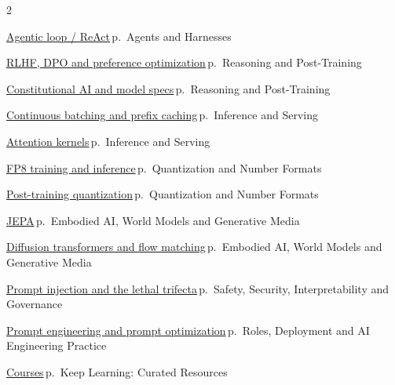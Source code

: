 \documentclass[10pt,a4paper,openany]{report}
\begin{document}
\begin{multicols}{2}\small\raggedright
\hyperref[c:agents-3]{Agentic loop / ReAct}\,{\color{muted}\scriptsize p.\,\pageref{c:agents-3}} {\color{muted}\scriptsize Agents and Harnesses}\par\vspace{2pt}
\hyperref[c:reasoning-6]{RLHF, DPO and preference optimization}\,{\color{muted}\scriptsize p.\,\pageref{c:reasoning-6}} {\color{muted}\scriptsize Reasoning and Post-Training}\par\vspace{2pt}
\hyperref[c:reasoning-7]{Constitutional AI and model specs}\,{\color{muted}\scriptsize p.\,\pageref{c:reasoning-7}} {\color{muted}\scriptsize Reasoning and Post-Training}\par\vspace{2pt}
\hyperref[c:inference-2]{Continuous batching and prefix caching}\,{\color{muted}\scriptsize p.\,\pageref{c:inference-2}} {\color{muted}\scriptsize Inference and Serving}\par\vspace{2pt}
\hyperref[c:inference-5]{Attention kernels}\,{\color{muted}\scriptsize p.\,\pageref{c:inference-5}} {\color{muted}\scriptsize Inference and Serving}\par\vspace{2pt}
\hyperref[c:quant-2]{FP8 training and inference}\,{\color{muted}\scriptsize p.\,\pageref{c:quant-2}} {\color{muted}\scriptsize Quantization and Number Formats}\par\vspace{2pt}
\hyperref[c:quant-3]{Post-training quantization}\,{\color{muted}\scriptsize p.\,\pageref{c:quant-3}} {\color{muted}\scriptsize Quantization and Number Formats}\par\vspace{2pt}
\hyperref[c:embodied-3]{JEPA}\,{\color{muted}\scriptsize p.\,\pageref{c:embodied-3}} {\color{muted}\scriptsize Embodied AI, World Models and Generative Media}\par\vspace{2pt}
\hyperref[c:embodied-5]{Diffusion transformers and flow matching}\,{\color{muted}\scriptsize p.\,\pageref{c:embodied-5}} {\color{muted}\scriptsize Embodied AI, World Models and Generative Media}\par\vspace{2pt}
\hyperref[c:safety-3]{Prompt injection and the lethal trifecta}\,{\color{muted}\scriptsize p.\,\pageref{c:safety-3}} {\color{muted}\scriptsize Safety, Security, Interpretability and Governance}\par\vspace{2pt}
\hyperref[c:practice-3]{Prompt engineering and prompt optimization}\,{\color{muted}\scriptsize p.\,\pageref{c:practice-3}} {\color{muted}\scriptsize Roles, Deployment and AI Engineering Practice}\par\vspace{2pt}
\hyperref[c:learn-1]{Courses}\,{\color{muted}\scriptsize p.\,\pageref{c:learn-1}} {\color{muted}\scriptsize Keep Learning: Curated Resources}\par\vspace{2pt}
\end{multicols}
\end{document}
